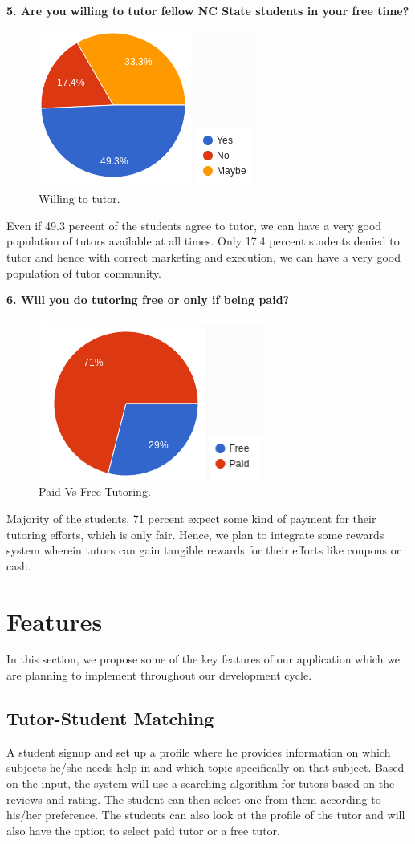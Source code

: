 \documentclass{sig-alternate-05-2015}
\begin{document}
\textbf {5. Are you willing to tutor fellow NC State students in your free time?}
\begin{figure}[ht]
\centering
\includegraphics{Q5SE}
\caption{Willing to tutor.}
\end{figure}

Even if 49.3 percent of the students agree to tutor, we can have a very good population of tutors available at all times. Only 17.4 percent students denied to tutor and hence with correct marketing and execution, we can have a very good population of tutor community.

\textbf {6. Will you do tutoring free or only if being paid?}
\begin{figure}[ht]
\centering
\includegraphics{Q6SE}
\caption{Paid Vs Free Tutoring.}
\end{figure}
Majority of the students, 71 percent expect some kind of payment for their tutoring efforts, which is only fair. Hence, we plan to integrate some rewards system wherein tutors can gain tangible rewards for their efforts like coupons or cash.

\section{Features}
In this section, we propose some of the key features of our application which we are planning to implement throughout our development cycle.


\subsection{Tutor-Student Matching}
A student signup and set up a profile where he provides information on which subjects he/she needs help in and which topic specifically on that subject. Based on the input, the system will use a searching algorithm for tutors based on the reviews and rating. The student can then select one from them according to his/her preference. The students can also look at the profile of the tutor and will also have the option to select paid tutor or a free tutor.
\end{document}
